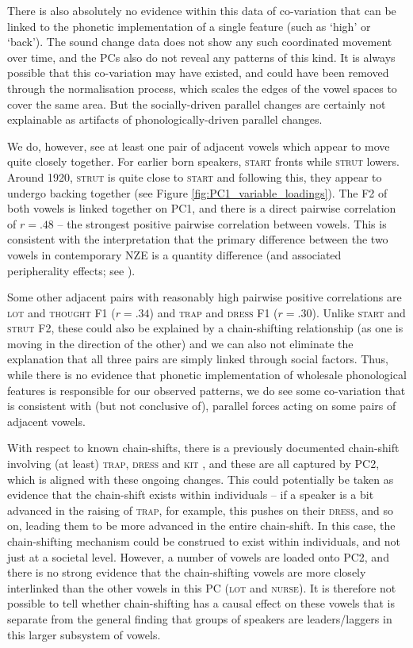 \documentclass[review]{elsarticle} %
\begin{document}
There is also absolutely no evidence within this data of co-variation that can be linked to the phonetic implementation of a single feature (such as `high' or `back').  The sound change data does not show any such coordinated movement over time, and the PCs also do not reveal any patterns of this kind.  It is always possible that this co-variation may have existed, and could have been removed through the normalisation process, which scales the edges of the vowel spaces to cover the same area.  But the socially-driven parallel changes are certainly not explainable as artifacts of phonologically-driven parallel changes.

We do, however, see at least one pair of adjacent vowels which appear to move quite closely together. For earlier born speakers, \textsc{start} fronts while \textsc{strut} lowers.  Around 1920, \textsc{strut} is quite close to \textsc{start} and following this, they appear to undergo backing together (see Figure \ref{fig:PC1_variable_loadings}).  The F2 of both vowels is linked together on PC1, and there is a direct pairwise correlation of $r = .48$ -- the strongest positive pairwise correlation between vowels.  This is consistent with the interpretation that the primary difference between the two vowels in contemporary NZE is a quantity difference (and associated peripherality effects; see \citealt{warren2006oops, bauer2008new, warren2018quality}).

Some other adjacent pairs with reasonably high pairwise positive correlations are \textsc{lot} and \textsc{thought} F1 ($r = .34$) and \textsc{trap} and \textsc{dress} F1 ($r = .30$).  Unlike \textsc{start} and \textsc{strut} F2, these could also be explained by a chain-shifting relationship (as one is moving in the direction of the other) and we can also not eliminate the explanation that all three pairs are simply linked through social factors.  Thus, while there is no evidence that phonetic implementation of wholesale phonological features is responsible for our observed patterns, we do see some co-variation that is consistent with (but not conclusive of), parallel forces acting on some pairs of adjacent vowels.

With respect to known chain-shifts, there is a previously documented chain-shift involving (at least) \textsc{trap}, \textsc{dress} and \textsc{kit} \citep{hay2015tracking}, and these are all captured by PC2, which is aligned with these ongoing changes.  This could potentially be taken as evidence that the chain-shift exists within individuals -- if a speaker is a bit advanced in the raising of \textsc{trap}, for example, this pushes on their \textsc{dress}, and so on, leading them to be more advanced in the entire chain-shift. In this case, the chain-shifting mechanism could be construed to exist within individuals, and not just at a societal level.  However, a number of vowels are loaded onto PC2, and there is no strong evidence that the chain-shifting vowels are more closely interlinked than the other vowels in this PC (\textsc{lot} and \textsc{nurse}).  It is therefore not possible to tell whether chain-shifting has a causal effect on these vowels that is separate from the general finding that groups of speakers are leaders/laggers in this larger subsystem of vowels.
\end{document}
